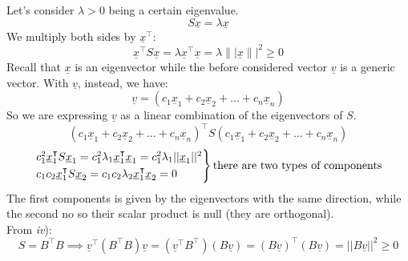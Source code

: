 Let's consider $\lambda > 0$ being a certain eigenvalue. 
\[ 
    S\underline{x} = \lambda\underline{x}    
\]
We multiply both sides by $\underline{x}^\intercal$:
\[
    \underline{x}^\intercal S\underline{x} = \lambda\underline{x}^\intercal\underline{x} = \lambda\||\underline{x}\||^2 \geq 0
\]
Recall that $\underline{x}$ is an eigenvector while the before considered vector $\underline{v}$ is a generic vector. With $\underline{v}$, instead, we have:
\[
    \underline{v} = (c_1\underline{x}_1 + c_2\underline{x}_2 + \dots + c_n\underline{x}_n)    
\]
So we are expressing $\underline{v}$ as a linear combination of the eigenvectors of $S$. 
\[
    (c_1\underline{x}_1 + c_2\underline{x}_2 + \dots + c_n\underline{x}_n)^\intercal S (c_1\underline{x}_1 + c_2\underline{x}_2 + \dots + c_n\underline{x}_n)        
\]
\[
    \begin{rcases}
        c_1^2\underline{x}_1^\intercal S \underline{x}_1 = c_1^2\lambda_1\underline{x}_1^\intercal \underline{x}_1 = c_1^2\lambda_1||\underline{x}_1||^2\\
        c_1c_2\underline{x}_1^\intercal S \underline{x}_2 = c_1c_2\lambda_2\underline{x}_1^\intercal \underline{x}_2 = 0\\
    \end{rcases}    
    \text{there are two types of components}
\]
The first components is given by the eigenvectors with the same direction, while the second no so their scalar product is null (they are orthogonal).\\

From \textit{iv}):
\[
    S = B^\intercal B \implies \underline{v}^\intercal(B^\intercal B)\underline{v} = (\underline{v}^\intercal B^\intercal)(B \underline{v}) = (B\underline{v})^\intercal (B\underline{v}) = ||B\underline{v}||^2 \geq 0   
\]

